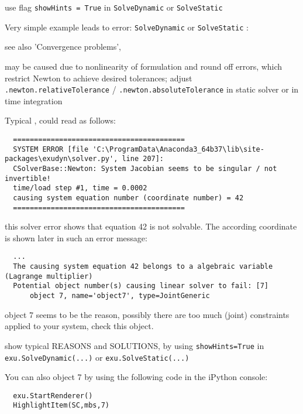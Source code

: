 \bi
\item[$\ra$] use flag \texttt{showHints = True} in \texttt{SolveDynamic} or \texttt{SolveStatic}
\ei
\item Very simple example  leads to error: \texttt{SolveDynamic} or \texttt{SolveStatic} :
\bi
\item[$\ra$] see also 'Convergence problems', 
\item[$\ra$] may be caused due to nonlinearity of formulation and round off errors, which restrict Newton to achieve desired tolerances; adjust  \texttt{.newton.relativeTolerance} / \texttt{.newton.absoluteTolerance} in static solver or in time integration
\ei
\item Typical , could read as follows:
\begin{lstlisting}
  =========================================
  SYSTEM ERROR [file 'C:\ProgramData\Anaconda3_64b37\lib\site-packages\exudyn\solver.py', line 207]: 
  CSolverBase::Newton: System Jacobian seems to be singular / not invertible!
  time/load step #1, time = 0.0002
  causing system equation number (coordinate number) = 42
  =========================================
\end{lstlisting}
\onlyRST{\rstStartNewLine}
%
\bi
\item[$\ra$] this solver error shows that equation 42 is not solvable. The according coordinate is shown later in such an error message:
\ei
\begin{lstlisting}
  ...
  The causing system equation 42 belongs to a algebraic variable (Lagrange multiplier)
  Potential object number(s) causing linear solver to fail: [7]
      object 7, name='object7', type=JointGeneric
\end{lstlisting}
\onlyRST{\rstStartNewLine}
%
\bi
\item[$\ra$] object 7 seems to be the reason, possibly there are too much (joint) constraints applied to your system, check this object.
\item[$\ra$] show typical REASONS and SOLUTIONS, by using \texttt{showHints=True} in \texttt{exu.SolveDynamic(...)} or \texttt{exu.SolveStatic(...)}
\item[$\ra$] You can also  object 7 by using the following code in the iPython console:
\ei
\pythonstyle\begin{lstlisting}
  exu.StartRenderer()
  HighlightItem(SC,mbs,7)
\end{lstlisting}
